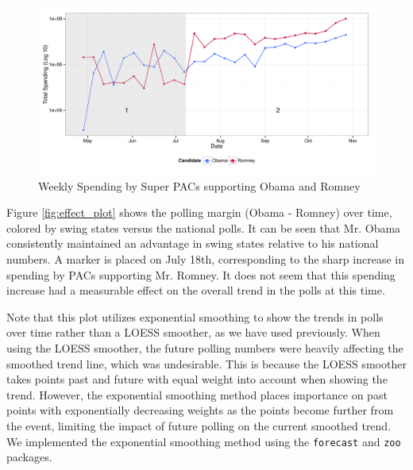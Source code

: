 \documentclass[11pt]{article}\usepackage{graphicx, color}
\newenvironment{knitrout}{}{} %
\begin{document}
\begin{knitrout}
\color{fgcolor}\begin{figure}[H]


{\centering \includegraphics[width=\textwidth]{figure/trend_plot} 

}

\caption[Weekly Spending by Super PACs supporting Obama and Romney]{Weekly Spending by Super PACs supporting Obama and Romney\label{fig:trend_plot}}
\end{figure}

\end{knitrout}



Figure \ref{fig:effect_plot} shows the polling margin (Obama - Romney) over time, colored by swing states versus the national polls. It can be seen that Mr. Obama consistently maintained an advantage in swing states relative to his national numbers. A marker is placed on July 18th, corresponding to the sharp increase in spending by PACs supporting Mr. Romney. It does not seem that this spending increase had a measurable effect on the overall trend in the polls at this time.

Note that this plot utilizes exponential smoothing to show the trends in polls over time rather than a LOESS smoother, as we have used previously. When using the LOESS smoother, the future polling numbers were heavily affecting the smoothed trend line, which was undesirable. This is because the LOESS smoother takes points past and future with equal weight into account when showing the trend. However, the exponential smoothing method places importance on past points with exponentially decreasing weights as the points become further from the event, limiting the impact of future polling on the current smoothed trend. We implemented the exponential smoothing method using the \texttt{forecast} and \texttt{zoo} packages.
\end{document}
